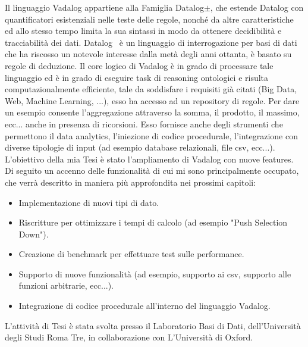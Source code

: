 Il linguaggio Vadalog appartiene alla Famiglia Datalog$\pm $, che estende Datalog con quantificatori esistenziali nelle teste delle regole, nonché da altre caratteristiche ed allo stesso tempo limita la sua sintassi in modo da ottenere decidibilità e tracciabilità dei dati.\newline
Datalog~\cite{WIKI:DATALOG} è un linguaggio di interrogazione per basi di dati che ha riscosso un notevole interesse dalla metà degli anni ottanta, è basato su regole di deduzione. \newline
Il core logico di Vadalog è in grado di processare tale linguaggio ed è in grado di eseguire task di reasoning ontologici e risulta computazionalmente efficiente, tale da soddisfare i requisiti già citati (Big Data, Web, Machine Learning, ...), esso ha accesso ad un repository di regole. Per dare un esempio consente l'aggregazione attraverso la somma, il prodotto, il massimo, ecc... anche in presenza di ricorsioni. \newline
Esso fornisce anche degli strumenti che permettono il data analytics, l'iniezione di codice procedurale, l'integrazione con diverse tipologie di input (ad esempio database relazionali, file csv, ecc...).\newline \newline
L'obiettivo della mia Tesi è stato l'ampliamento di Vadalog con nuove features. \newline
Di seguito un accenno delle funzionalità di cui mi sono principalmente occupato, che verrà descritto in maniera più approfondita nei prossimi capitoli:
\begin{itemize}
	\item Implementazione di nuovi tipi di dato.
	\item Riscritture per ottimizzare i tempi di calcolo (ad esempio "Push Selection Down").
	\item Creazione di benchmark per effettuare test sulle performance.
	\item Supporto di nuove funzionalità (ad esempio, supporto ai csv, supporto alle funzioni arbitrarie, ecc...).
	\item Integrazione di codice procedurale all'interno del linguaggio Vadalog.
\end{itemize}
L'attività di Tesi è stata svolta presso il Laboratorio Basi di Dati, dell'Università degli Studi Roma Tre, in collaborazione con L'Università di Oxford.

